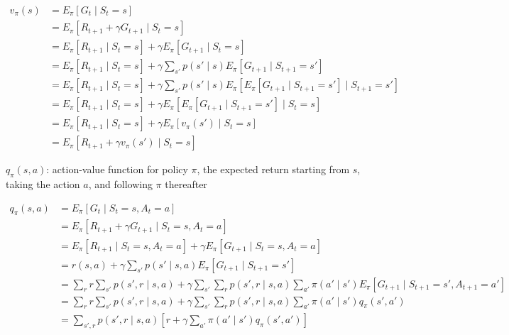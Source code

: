 \documentclass{article}
\begin{document}
\begin{equation*}
\begin{split}
v_{\pi}(s)
& = E_{\pi}[G_t \mid S_t = s] \\
& = E_{\pi}[R_{t + 1} + \gamma G_{t + 1} \mid S_t = s] \\
& = E_{\pi}[R_{t + 1} \mid S_t = s] + \gamma E_{\pi}[G_{t + 1} \mid S_t = s] \\
& = E_{\pi}[R_{t + 1} \mid S_t = s] + \gamma \sum_{s'} p(s' \mid s) E_{\pi}[G_{t + 1} \mid S_{t + 1} = s'] \\
& = E_{\pi}[R_{t + 1} \mid S_t = s] + \gamma \sum_{s'} p(s' \mid s) E_{\pi}[E_{\pi}[G_{t + 1} \mid S_{t + 1} = s'] \mid S_{t + 1} = s'] \\
& = E_{\pi}[R_{t + 1} \mid S_t = s] + \gamma E_{\pi}[E_{\pi}[G_{t + 1} \mid S_{t + 1} = s'] \mid S_t = s] \\
& = E_{\pi}[R_{t + 1} \mid S_t = s] + \gamma E_{\pi}[v_{\pi}(s') \mid S_t = s] \\
& = E_{\pi}[R_{t + 1} + \gamma v_{\pi}(s') \mid S_t = s]
\end{split}
\end{equation*}

\(q_{\pi}(s, a)\): action-value function for policy \(\pi\), the expected return starting from \(s\), taking the action \(a\), and following \(\pi\) thereafter

\begin{equation*}
\begin{split}
q_{\pi}(s, a)
& = E_{\pi}[G_t \mid S_t = s, A_t = a] \\
& = E_{\pi}[R_{t + 1} + \gamma G_{t + 1} \mid S_t = s, A_t = a] \\
& = E_{\pi}[R_{t + 1} \mid S_t = s, A_t = a] + \gamma E_{\pi}[G_{t + 1} \mid S_t = s, A_t = a] \\
& = r(s, a) + \gamma \sum_{s'} p(s' \mid s, a) E_{\pi}[G_{t + 1} \mid S_{t + 1} = s'] \\
& = \sum_r r \sum_{s'} p(s', r \mid s, a) + \gamma \sum_{s'} \sum_{r} p(s', r \mid s, a) \sum_{a'} \pi(a' \mid s') E_{\pi}[G_{t + 1} \mid S_{t + 1} = s', A_{t + 1} = a'] \\
& = \sum_r r \sum_{s'} p(s', r \mid s, a) + \gamma \sum_{s'} \sum_{r} p(s', r \mid s, a) \sum_{a'} \pi(a' \mid s') q_{\pi}(s', a') \\
& = \sum_{s', r} p(s', r \mid s, a) [r + \gamma \sum_{a'} \pi(a' \mid s') q_{\pi}(s', a')]
\end{split}
\end{equation*}
\end{document}
